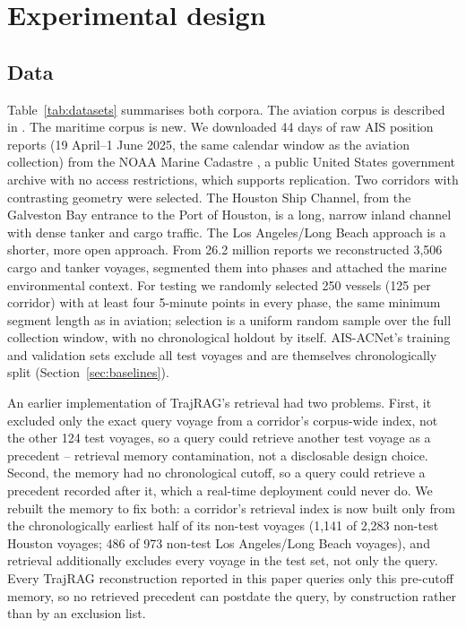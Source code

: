 \section{Experimental design}
\label{sec:design}

\subsection{Data}
\label{sec:data}

Table~\ref{tab:datasets} summarises both corpora. The aviation corpus is
described in \citet{felendler2026trajrag}. The maritime corpus is new. We
downloaded 44 days of raw AIS position reports (19 April--1 June 2025, the
same calendar window as the aviation collection) from the NOAA Marine
Cadastre \citep{noaa2025marinecadastre}, a public United States government
archive with no access restrictions, which supports replication. Two
corridors with contrasting geometry were selected. The Houston Ship Channel,
from the Galveston Bay entrance to the Port of Houston, is a long, narrow
inland channel with dense tanker and cargo traffic. The Los Angeles/Long
Beach approach is a shorter, more open approach. From 26.2 million reports
we reconstructed 3,506 cargo and tanker voyages, segmented them into phases
and attached the marine environmental context. For testing we randomly
selected 250 vessels (125 per corridor) with at least four 5-minute points
in every phase, the same minimum segment length as in aviation; selection is
a uniform random sample over the full collection window, with no
chronological holdout by itself. AIS-ACNet's training and validation sets
exclude all test voyages and are themselves chronologically split
(Section~\ref{sec:baselines}).

An earlier implementation of TrajRAG's retrieval had two problems. First, it
excluded only the exact query voyage from a corridor's corpus-wide index,
not the other 124 test voyages, so a query could retrieve another test
voyage as a precedent -- retrieval memory contamination, not a disclosable
design choice. Second, the memory had no chronological cutoff, so a query
could retrieve a precedent recorded after it, which a real-time deployment
could never do. We rebuilt the memory to fix both: a corridor's retrieval
index is now built only from the chronologically earliest half of its
non-test voyages (1,141 of 2,283 non-test Houston voyages; 486 of 973
non-test Los Angeles/Long Beach voyages), and retrieval additionally
excludes every voyage in the test set, not only the query. Every TrajRAG
reconstruction reported in this paper queries only this pre-cutoff memory,
so no retrieved precedent can postdate the query, by construction rather
than by an exclusion list.

